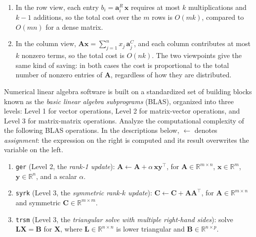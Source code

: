 \begin{solution}
    \begin{enumerate}[label=(\alph*)]
        \item In the row view, each entry $b_i = \mathbf{a}^R_i\, \mathbf{x}$ requires at most $k$ multiplications and $k-1$ additions, so the total cost over the $m$ rows is $O(mk)$, compared to $O(mn)$ for a dense matrix.
        \item In the column view, $\mathbf{A}\mathbf{x} = \sum_{j=1}^n x_j\, \mathbf{a}^C_j$, and each column contributes at most $k$ nonzero terms, so the total cost is $O(nk)$. The two viewpoints give the same kind of saving: in both cases the cost is proportional to the total number of nonzero entries of $\mathbf{A}$, regardless of how they are distributed.
    \end{enumerate}
\end{solution}

\begin{exercise} %
    Numerical linear algebra software is built on a standardized set of building blocks known as the \emph{basic linear algebra subprograms} (BLAS), organized into three levels: Level 1 for vector operations, Level 2 for matrix-vector operations, and Level 3 for matrix-matrix operations.
    Analyze the computational complexity of the following BLAS operations.
    In the descriptions below, $\leftarrow$ denotes \emph{assignment}: the expression on the right is computed and its result overwrites the variable on the left.
    \begin{enumerate}[label=(\alph*)]
        \item \texttt{ger} (Level 2, the \emph{rank-1 update}): $\mathbf{A} \leftarrow \mathbf{A} + \alpha\, \mathbf{x}\mathbf{y}^\top$, for $\mathbf{A} \in \mathbb{R}^{m \times n}$, $\mathbf{x} \in \mathbb{R}^m$, $\mathbf{y} \in \mathbb{R}^n$, and a scalar $\alpha$.
        \item \texttt{syrk} (Level 3, the \emph{symmetric rank-$k$ update}): $\mathbf{C} \leftarrow \mathbf{C} + \mathbf{A}\mathbf{A}^\top$, for $\mathbf{A} \in \mathbb{R}^{m \times n}$ and symmetric $\mathbf{C} \in \mathbb{R}^{m \times m}$.
        \item \texttt{trsm} (Level 3, the \emph{triangular solve with multiple right-hand sides}): solve $\mathbf{L}\mathbf{X} = \mathbf{B}$ for $\mathbf{X}$, where $\mathbf{L} \in \mathbb{R}^{n \times n}$ is lower triangular and $\mathbf{B} \in \mathbb{R}^{n \times p}$.
    \end{enumerate}
\end{exercise}

